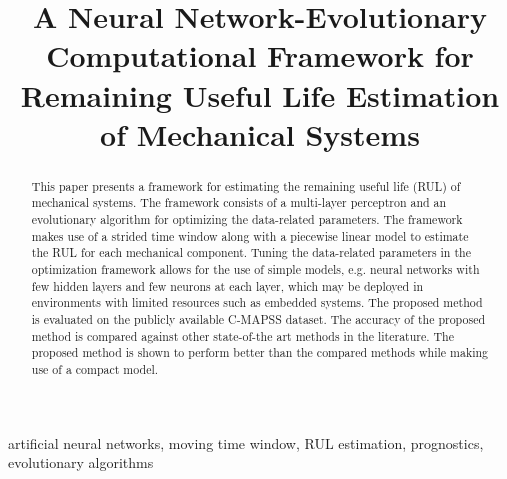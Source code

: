 


\begin{frontmatter}

\title{A Neural Network-Evolutionary Computational Framework for Remaining Useful Life Estimation of Mechanical Systems}

\begin{comment}
\author{David Laredo$^{1}$, Zhaoyin Chen$^{1}$, Oliver Sch\"utze$^{2}$ and Jian-Qiao Sun$^{1}$}
\address{
$^{1}$Department of Mechanical Engineering\\
School of Engineering, University of California\\
Merced, CA 95343, USA\\
$^{2}$Department of Computer Science, CINVESTAV\\ 
Mexico City, Mexico\\
Corresponding author. Email: jqsun@ucmerced.edu}
\end{comment}

\begin{abstract}
This paper presents a framework for estimating the remaining useful life (RUL) of mechanical systems. The framework consists of a multi-layer perceptron and an evolutionary algorithm for optimizing the data-related parameters. The framework makes use of a strided time window along with a piecewise linear model to estimate the RUL for each mechanical component. Tuning the data-related parameters in the optimization framework allows for the use of simple models, e.g. neural networks with few hidden layers and few neurons at each layer, which may be deployed in environments with limited resources such as embedded systems. The proposed method is evaluated on the publicly available C-MAPSS dataset. The accuracy of the proposed method is compared against other state-of-the art methods in the literature. The proposed method is shown to perform better than the compared methods while making use of a compact model.

\end{abstract}


\begin{keyword}
artificial neural networks\sep
moving time window\sep
RUL estimation\sep
prognostics\sep
evolutionary algorithms
\end{keyword}

\end{frontmatter}
